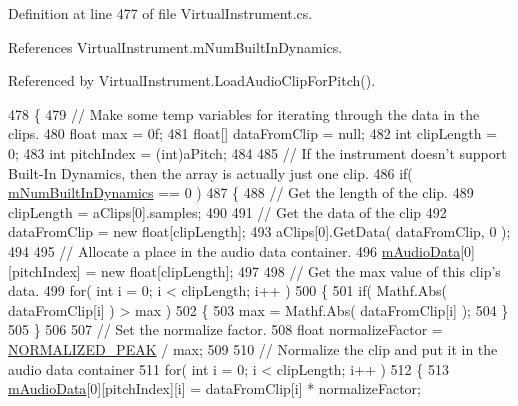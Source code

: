 Definition at line 477 of file Virtual\+Instrument.\+cs.



References Virtual\+Instrument.\+m\+Num\+Built\+In\+Dynamics.



Referenced by Virtual\+Instrument.\+Load\+Audio\+Clip\+For\+Pitch().


\begin{DoxyCode}
478     \{
479         \textcolor{comment}{// Make some temp variables for iterating through the data in the clips.}
480         \textcolor{keywordtype}{float} max = 0f;
481         \textcolor{keywordtype}{float}[] dataFromClip = null;
482         \textcolor{keywordtype}{int} clipLength = 0;
483         \textcolor{keywordtype}{int} pitchIndex = (int)aPitch;
484 
485         \textcolor{comment}{// If the instrument doesn't support Built-In Dynamics, then the array is actually just one clip.}
486         \textcolor{keywordflow}{if}( \hyperlink{group___v_i_base_pro_var_gac265f64f759d267ee1e1680f8d387011}{mNumBuiltInDynamics} == 0 )
487         \{
488             \textcolor{comment}{// Get the length of the clip.}
489             clipLength = aClips[0].samples;
490 
491             \textcolor{comment}{// Get the data of the clip}
492             dataFromClip = \textcolor{keyword}{new} \textcolor{keywordtype}{float}[clipLength];
493             aClips[0].GetData( dataFromClip, 0 );
494 
495             \textcolor{comment}{// Allocate a place in the audio data container.}
496             \hyperlink{group___v_i_base_pro_var_ga52e76d9b74408660584676035a92a2c6}{mAudioData}[0][pitchIndex] = \textcolor{keyword}{new} \textcolor{keywordtype}{float}[clipLength];
497 
498             \textcolor{comment}{// Get the max value of this clip's data.}
499             \textcolor{keywordflow}{for}( \textcolor{keywordtype}{int} i = 0; i < clipLength; i++ )
500             \{
501                 \textcolor{keywordflow}{if}( Mathf.Abs( dataFromClip[i] ) > max )
502                 \{
503                     max = Mathf.Abs( dataFromClip[i] );
504                 \}
505             \}
506 
507             \textcolor{comment}{// Set the normalize factor.}
508             \textcolor{keywordtype}{float} normalizeFactor = \hyperlink{group___v_i_base_const_gaf060c000443f92784bd8db8d866d8b2a}{NORMALIZED\_PEAK} / max;
509 
510             \textcolor{comment}{// Normalize the clip and put it in the audio data container}
511             \textcolor{keywordflow}{for}( \textcolor{keywordtype}{int} i = 0; i < clipLength; i++ )
512             \{
513                 \hyperlink{group___v_i_base_pro_var_ga52e76d9b74408660584676035a92a2c6}{mAudioData}[0][pitchIndex][i] = dataFromClip[i] * normalizeFactor;

\end{DoxyCode}
